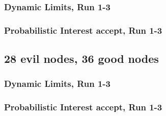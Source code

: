 \documentclass[onecolumn]{IEEEtran}
\begin{document}
\subsubsection{Dynamic Limits, Run 1-3}

\begin{minipage}[b]{\textwidth}

\end{minipage}

\clearpage

\subsubsection{Probabilistic Interest accept, Run 1-3}

\begin{minipage}[b]{\textwidth}

\end{minipage}

\clearpage
\subsection{\textbf{28 evil nodes}, 36 good nodes}

\subsubsection{Dynamic Limits, Run 1-3}

\begin{minipage}[b]{\textwidth}

\end{minipage}

\clearpage

\subsubsection{Probabilistic Interest accept, Run 1-3}

\begin{minipage}[b]{\textwidth}

\end{minipage}

\end{document}

